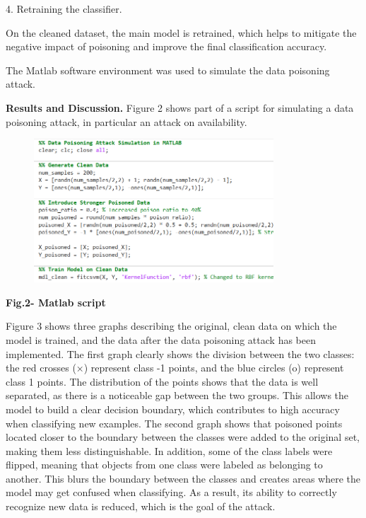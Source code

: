 4. Retraining the classifier.

On the cleaned dataset, the main model is retrained, which helps to
mitigate the negative impact of poisoning and improve the final
classification accuracy.

The Matlab software environment was used to simulate the data poisoning
attack.

{\bfseries Results and Discussion.} Figure 2 shows part of a script for
simulating a data poisoning attack, in particular an attack on
availability.


\begin{figure}[H]
	\centering
	\includegraphics[width=0.8\textwidth]{media/ict2/image225}
	\caption*{}
\end{figure}


{\bfseries Fig.2- Matlab script}

Figure 3 shows three graphs describing the original, clean data on which
the model is trained, and the data after the data poisoning attack has
been implemented. The first graph clearly shows the division between the
two classes: the red crosses (×) represent class -1 points, and the blue
circles (o) represent class 1 points. The distribution of the points
shows that the data is well separated, as there is a noticeable gap
between the two groups. This allows the model to build a clear decision
boundary, which contributes to high accuracy when classifying new
examples. The second graph shows that poisoned points located closer to
the boundary between the classes were added to the original set, making
them less distinguishable. In addition, some of the class labels were
flipped, meaning that objects from one class were labeled as belonging
to another. This blurs the boundary between the classes and creates
areas where the model may get confused when classifying. As a result,
its ability to correctly recognize new data is reduced, which is the
goal of the attack.

